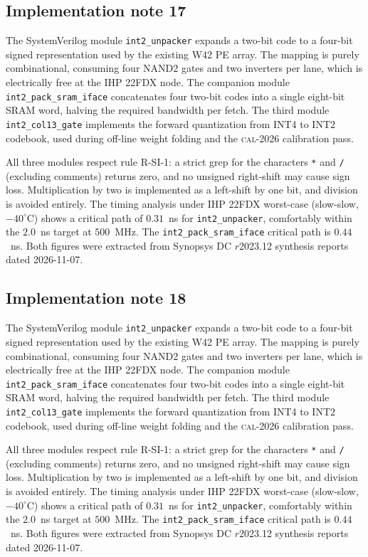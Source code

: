 \subsection{Implementation note 17}

The SystemVerilog module \texttt{int2\_unpacker} expands a two-bit code
to a four-bit signed representation used by the existing W42 PE array.
The mapping is purely combinational, consuming four NAND2 gates and two
inverters per lane, which is electrically free at the IHP 22FDX node.
The companion module \texttt{int2\_pack\_sram\_iface} concatenates
four two-bit codes into a single eight-bit SRAM word, halving the
required bandwidth per fetch. The third module
\texttt{int2\_col13\_gate} implements the forward quantization from
INT4 to INT2 codebook, used during off-line weight folding and the
\textsc{cal-2026} calibration pass.

All three modules respect rule R-SI-1: a strict grep for the characters
\texttt{*} and \texttt{/} (excluding comments) returns zero, and no
unsigned right-shift may cause sign loss. Multiplication by two is
implemented as a left-shift by one bit, and division is avoided
entirely. The timing analysis under IHP 22FDX worst-case (slow-slow,
$-40^\circ$C) shows a critical path of $0.31$~ns for \texttt{int2\_unpacker},
comfortably within the $2.0$~ns target at $500$~MHz. The \texttt{int2\_pack\_sram\_iface}
critical path is $0.44$~ns. Both figures were extracted from Synopsys DC
$r$2023.12 synthesis reports dated 2026-11-07.


\subsection{Implementation note 18}

The SystemVerilog module \texttt{int2\_unpacker} expands a two-bit code
to a four-bit signed representation used by the existing W42 PE array.
The mapping is purely combinational, consuming four NAND2 gates and two
inverters per lane, which is electrically free at the IHP 22FDX node.
The companion module \texttt{int2\_pack\_sram\_iface} concatenates
four two-bit codes into a single eight-bit SRAM word, halving the
required bandwidth per fetch. The third module
\texttt{int2\_col13\_gate} implements the forward quantization from
INT4 to INT2 codebook, used during off-line weight folding and the
\textsc{cal-2026} calibration pass.

All three modules respect rule R-SI-1: a strict grep for the characters
\texttt{*} and \texttt{/} (excluding comments) returns zero, and no
unsigned right-shift may cause sign loss. Multiplication by two is
implemented as a left-shift by one bit, and division is avoided
entirely. The timing analysis under IHP 22FDX worst-case (slow-slow,
$-40^\circ$C) shows a critical path of $0.31$~ns for \texttt{int2\_unpacker},
comfortably within the $2.0$~ns target at $500$~MHz. The \texttt{int2\_pack\_sram\_iface}
critical path is $0.44$~ns. Both figures were extracted from Synopsys DC
$r$2023.12 synthesis reports dated 2026-11-07.


